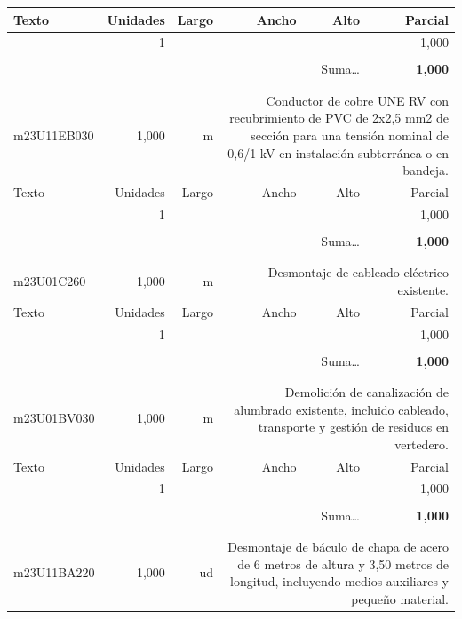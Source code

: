 \documentclass{book}%
\begin{document}
\begin{longtable}{lrrrrr}
Texto&Unidades&Largo&Ancho&Alto&Parcial\\%
\hline%
\multicolumn{1}{p{3.5cm}}{ }&1&&&&     1,000\\%
&&&&&\\%
\multicolumn{5}{r}{Suma\ldots}&\textbf{     1,000}\\%
\hline%
&&&&&\\%
&&&&&\\%
m23U11EB030&     1,000& m&\multicolumn{3}{p{6cm}}{\scriptsize Conductor de cobre UNE RV con recubrimiento de PVC de 2x2,5 mm2 de sección para una tensión nominal de 0,6/1 kV en instalación subterránea o en bandeja.\normalsize}\\%
Texto&Unidades&Largo&Ancho&Alto&Parcial\\%
\hline%
\multicolumn{1}{p{3.5cm}}{ }&1&&&&     1,000\\%
&&&&&\\%
\multicolumn{5}{r}{Suma\ldots}&\textbf{     1,000}\\%
\hline%
&&&&&\\%
&&&&&\\%
m23U01C260&     1,000& m&\multicolumn{3}{p{6cm}}{\scriptsize Desmontaje de cableado eléctrico existente.\normalsize}\\%
Texto&Unidades&Largo&Ancho&Alto&Parcial\\%
\hline%
\multicolumn{1}{p{3.5cm}}{ }&1&&&&     1,000\\%
&&&&&\\%
\multicolumn{5}{r}{Suma\ldots}&\textbf{     1,000}\\%
\hline%
&&&&&\\%
&&&&&\\%
m23U01BV030&     1,000& m&\multicolumn{3}{p{6cm}}{\scriptsize Demolición de canalización de alumbrado existente, incluido cableado, transporte y gestión de residuos en vertedero.\normalsize}\\%
Texto&Unidades&Largo&Ancho&Alto&Parcial\\%
\hline%
\multicolumn{1}{p{3.5cm}}{ }&1&&&&     1,000\\%
&&&&&\\%
\multicolumn{5}{r}{Suma\ldots}&\textbf{     1,000}\\%
\hline%
&&&&&\\%
&&&&&\\%
m23U11BA220&     1,000& ud&\multicolumn{3}{p{6cm}}{\scriptsize Desmontaje de báculo de chapa de acero de 6 metros de altura y 3,50 metros de longitud, incluyendo medios auxiliares y pequeño material.\normalsize}\\%

\end{longtable}
\end{document}
